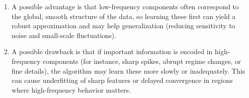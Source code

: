 \documentclass[11pt]{article}
\begin{document}
\begin{enumerate}
\begin{enumerate}
\item A possible advantage is that low-frequency components often correspond to the global, smooth structure of the data, so learning these first can yield a robust approximation and may help generalization (reducing sensitivity to noise and small-scale fluctuations).

\item A possible drawback is that if important information is encoded in high-frequency components (for instance, sharp spikes, abrupt regime changes, or fine details), the algorithm may learn these more slowly or inadequately. This can cause underfitting of sharp features or delayed convergence in regions where high-frequency behavior matters.
\end{enumerate}

\end{enumerate}
\end{document}
